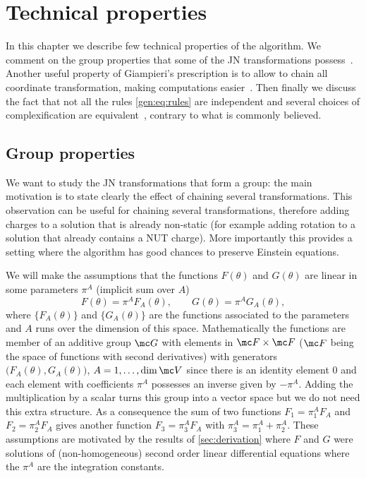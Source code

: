 \section{Technical properties}
\label{app:technical-properties}


In this chapter we describe few technical properties of the algorithm.
We comment on the group properties that some of the JN transformations possess~\cite{Erbin:2016:DecipheringGeneralizingDemianskiJanisNewman}.
Another useful property of Giampieri's prescription is to allow to chain all coordinate transformation, making computations easier~\cite{Erbin:2015:JanisNewmanAlgorithmSimplifications}.
Then finally we discuss the fact that not all the rules \eqref{gen:eq:rules} are independent and several choices of complexification are equivalent~\cite{Erbin:2015:JanisNewmanAlgorithmSimplifications}, contrary to what is commonly believed.


\subsection{Group properties}
\label{app:group-properties}


We want to study the JN transformations that form a group: the main motivation is to state clearly the effect of chaining several transformations.
This observation can be useful for chaining several transformations, therefore adding charges to a solution that is already non-static (for example adding rotation to a solution that already contains a NUT charge).
More importantly this provides a setting where the algorithm has good chances to preserve Einstein equations.

We will make the assumptions that the functions $F(\theta)$ and $G(\theta)$ are linear in some parameters $\pi^A$ (implicit sum over $A$)
\begin{equation}
	F(\theta) = \pi^A F_A(\theta), \qquad
	G(\theta) = \pi^A G_A(\theta),
\end{equation} 
where $\{ F_A(\theta) \}$ and $\{ G_A(\theta) \}$ are the functions associated to the parameters and $A$ runs over the dimension of this space.
Mathematically the functions are member of an additive group $\mc G$ with elements in\footnotemark{} $\mc F \times \mc F$ ($\mc F$ being the space of functions with second derivatives) with generators $\big( F_A(\theta), G_A(\theta) \big)$, $A = 1, \ldots, \dim \mc V$ since there is an identity element $0$ and each element with coefficients $\pi^A$ possesses an inverse given by $- \pi^A$.%
Adding the multiplication by a scalar turns this group into a vector space but we do not need this extra structure.
As a consequence the sum of two functions $F_1 = \pi_1^A F_A$ and $F_2 = \pi_2^A F_A$ gives another function $F_3 = \pi_3^A F_A$ with $\pi_3^A = \pi_1^A + \pi_2^A$.
These assumptions are motivated by the results of \cref{sec:derivation} where $F$ and $G$ were solutions of (non-homogeneous) second order linear differential equations where the $\pi^A$ are the integration constants.

